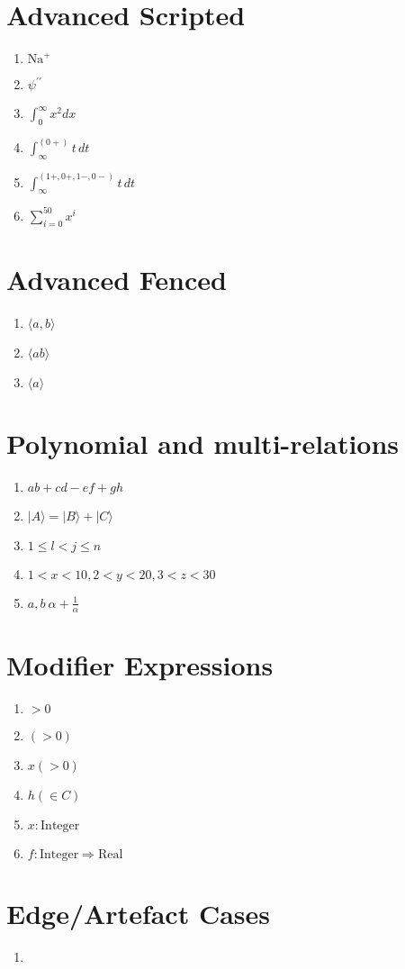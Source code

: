 \documentclass{article}
\begin{document}
\section{Advanced Scripted}
\begin{enumerate}
  \item $\mathrm{Na}^+$ %
  \item $\psi^{\prime\prime}$
  \item $\int_0^\infty x^2 dx$
  \item $\int_\infty^{(0+)} t\,dt$
  \item $\int_\infty^{(1+,0+,1−,0−)} t\,dt$
  \item $\sum_{i=0}^{50} x^i$
\end{enumerate}

\section{Advanced Fenced}
\begin{enumerate}
  \item $\langle a,b \rangle $ %
  \item $\langle ab \rangle $ %
  \item $\langle a \rangle$ %
\end{enumerate}

\section{Polynomial and multi-relations}
\begin{enumerate}
\item $ab + cd - ef + gh $
\item $|A\rangle = |B\rangle + |C\rangle$
\item $1 \leq l < j \leq n $
\item $1<x<10, 2<y<20, 3<z<30$
\item $a,b ~ \alpha + \frac{1}{\alpha}$
\end{enumerate}

\section{Modifier Expressions}
\begin{enumerate}
  \item $>0$
  \item $(>0)$
  \item $x(>0)$
  \item $h(\in C)$
  \item $x : \mathrm{Integer}$
  \item $f : \mathrm{Integer} \Rightarrow \mathrm{Real}$
\end{enumerate}

\section{Edge/Artefact Cases}
\begin{enumerate}
  \item $\,$  %
\end{enumerate}
\end{document}
